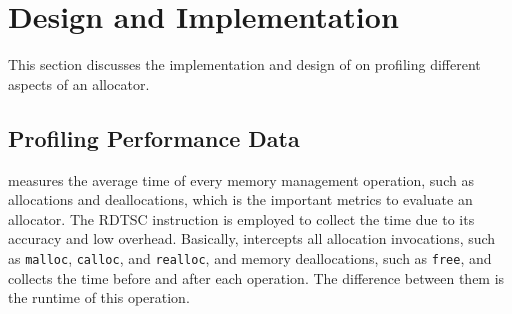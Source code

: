 \section{Design and Implementation}
\label{sec:implementation}

This section discusses the implementation and design of \MP{} on profiling different aspects of an allocator. 


\subsection{Profiling Performance Data}

\label{sec:performanceimplement}

\MP{} measures the average time of every memory management operation, such as allocations and deallocations, which is the important metrics to evaluate an allocator. The RDTSC instruction is employed to collect the time due to its accuracy and low overhead. Basically, \MP{} intercepts all allocation invocations, such as \texttt{malloc}, \texttt{calloc}, and \texttt{realloc}, and memory deallocations, such as \texttt{free}, and collects the time before and after each operation. The difference between them is the runtime of this operation.  

